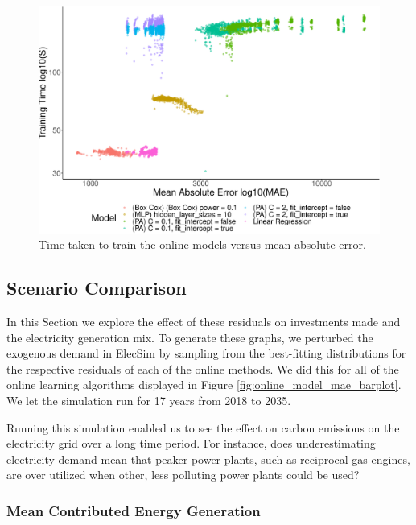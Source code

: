 \documentclass[final,3p,times,twocolumn,numbers]{elsarticle}
\begin{document}
\begin{figure}[h]
\centering
\includegraphics[width=\columnwidth]{figures/results/online_training_time_vs_mae_all_results_opaque.eps}
\caption{Time taken to train the online models versus mean absolute error.}
\label{fig:online_train_vs_mae}
\end{figure}








\subsection{Scenario Comparison}

In this Section we explore the effect of these residuals on investments made and the electricity generation mix.  To generate these graphs, we perturbed the exogenous demand in ElecSim by sampling from the best-fitting distributions for the respective residuals of each of the online methods. We did this for all of the online learning algorithms displayed in Figure \ref{fig:online_model_mae_barplot}. We let the simulation run for 17 years from 2018 to 2035. 

Running this simulation enabled us to see the effect on carbon emissions on the electricity grid over a long time period. For instance, does underestimating electricity demand mean that peaker power plants, such as reciprocal gas engines, are over utilized when other, less polluting power plants could be used?



\subsubsection{Mean Contributed Energy Generation}
\end{document}
